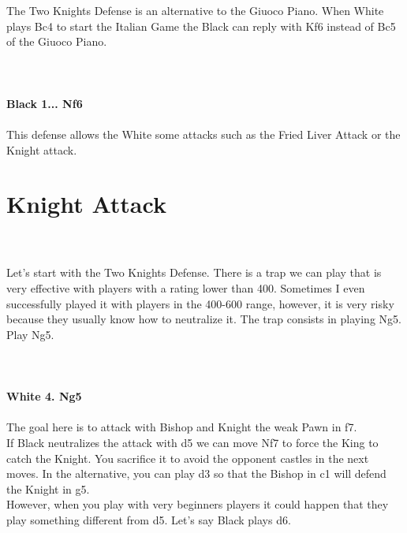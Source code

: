 \documentclass{article}
\begin{document}

\\
\\
The Two Knights Defense is an alternative to the Giuoco Piano. When White plays Bc4 to start the Italian Game the Black can reply with Kf6 instead of Bc5 of the Giuoco Piano.\\
\\

\\
\\
\textbf{Black 1... Nf6}\\
\\
This defense allows the White some attacks such as the Fried Liver Attack or the Knight attack.\\\section{ Knight Attack}

\\
\\
Let's start with the Two Knights Defense. There is a trap we can play that is very effective with players with a rating lower than 400. Sometimes I even successfully played it with players in the 400-600 range, however, it is very risky because they usually know how to neutralize it. The trap consists in playing Ng5. Play Ng5.\\
\\

\\
\\
\textbf{White 4. Ng5}\\
\\
The goal here is to attack with Bishop and Knight the weak Pawn in f7.\\If Black neutralizes the attack with d5 we can move Nf7 to force the King to catch the Knight. You sacrifice it to avoid the opponent castles in the next moves. In the alternative, you can play d3 so that the Bishop in c1 will defend the Knight in g5.\\However, when you play with very beginners players it could happen that they play something different from d5. Let's say Black plays d6.\\\\
\\

\\
\\
\end{document}

